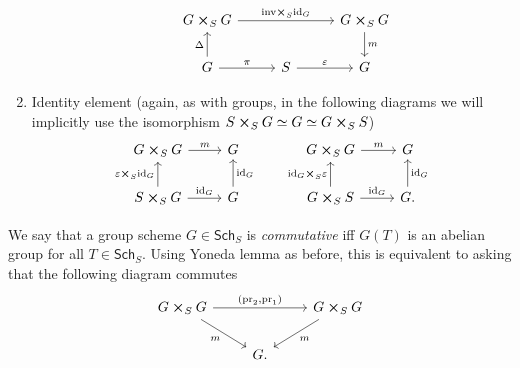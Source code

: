 \documentclass[../Main]{subfiles}
\begin{document}
\begin{rem}[]
\begin{enumerate}
\begin{equation*}
			\qquad
			\begin{tikzcd}[column sep=2.7em]
				G \cross_{ S } G
				\arrow[rr, "\mathrm{inv} \cross_S \mathrm{id}_{ G }", rightarrow] & &
				G \cross_{ S } G \arrow[d, "m", rightarrow] \\
				G \arrow[u, "\Delta", rightarrow] 
				\arrow[r, "\pi", rightarrow] &
				S \arrow[r, "\varepsilon", rightarrow] & 
				G
			\end{tikzcd}
			\end{equation*} 
		\item Identity element (again, as with groups, in the following diagrams
			we will implicitly use the isomorphism
			$S \cross_{ S } G \simeq G \simeq G \cross_{ S } S$)
			\begin{equation*}
			\begin{tikzcd}
				G \cross_{ S } G \arrow[r, "m", rightarrow] &
				G \\
				S \cross_{ S } G \arrow[r, "\mathrm{id}_{ G }", rightarrow] 
				\arrow[u, "\varepsilon \cross_S \mathrm{id}_{ G }", rightarrow] &
				G \arrow[u, "\mathrm{id}_{ G }"', rightarrow] 
			\end{tikzcd}
			\qquad
			\begin{tikzcd}
				G \cross_{ S } G \arrow[r, "m", rightarrow] &
				G \\
				G \cross_{ S } S \arrow[r, "\mathrm{id}_{ G }", rightarrow] 
				\arrow[u, "\mathrm{id}_{ G } \cross_S \varepsilon", rightarrow] &
				G. \arrow[u, "\mathrm{id}_{ G }"', rightarrow] 
			\end{tikzcd}
			\end{equation*} 
	\end{enumerate}
\end{rem}


\begin{defn}
	We say that a group scheme $G \in \mathsf{Sch}_{ S }$ is {\em commutative}
	iff $G(T)$ is an abelian group for all $T \in \mathsf{Sch}_{ S }$.
	Using Yoneda lemma as before,
	this is equivalent to asking that the following diagram commutes
	\begin{equation*}
	\begin{tikzcd}
		G \cross_S G \arrow[rr, "{ \left(\mathrm{pr}_2, \mathrm{pr}_1\right)}", rightarrow] 
		\arrow[rd, "m"', rightarrow] & &
		G \cross_{ S } G
		\arrow[ld, "m", rightarrow] \\
					     &
		G
	.\end{tikzcd}
	\end{equation*}
\end{defn}
\end{document}

